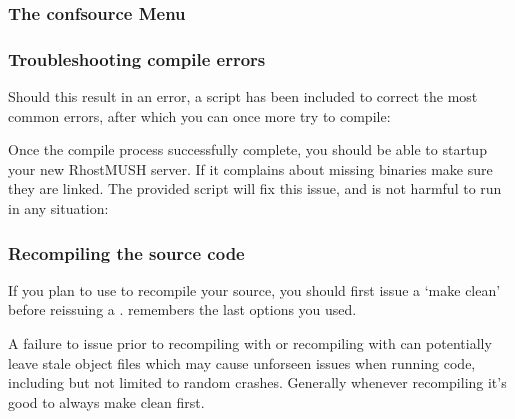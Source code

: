 \documentclass[letterpaper,10pt,english]{sphinxmanual}
\begin{document}
\begin{sphinxVerbatim}[commandchars=\\\{\}]
 
\end{sphinxVerbatim}


\subsubsection{The confsource Menu}
\label{\detokenize{install:the-confsource-menu}}

\subsubsection{Troubleshooting compile errors}
\label{\detokenize{install:troubleshooting-compile-errors}}
\sphinxAtStartPar
Should this result in an error, a script has been included to correct the most
common errors, after which you can once more try to compile:

\begin{sphinxVerbatim}[commandchars=\\\{\}]
 
\end{sphinxVerbatim}

\sphinxAtStartPar
Once the compile process successfully complete, you should be able to start\sphinxhyphen{}up
your new RhostMUSH server. If it complains about missing binaries make sure
they are linked. The provided script will fix this issue, and is not harmful
to run in any situation:

\begin{sphinxVerbatim}[commandchars=\\\{\}]
 
\end{sphinxVerbatim}


\subsubsection{Recompiling the source code}
\label{\detokenize{install:recompiling-the-source-code}}
\sphinxAtStartPar
If you plan to use  to recompile your source, you should first
issue a ‘make clean’ before re\sphinxhyphen{}issuing a .  
remembers the last options you used.

\sphinxAtStartPar
A failure to issue  prior to re\sphinxhyphen{}compiling with  or
re\sphinxhyphen{}compiling with  can potentially leave stale object files which
may cause unforseen issues when running code, including but not limited to
random crashes.  Generally whenever recompiling it’s good to always make clean
first.
\end{document}
